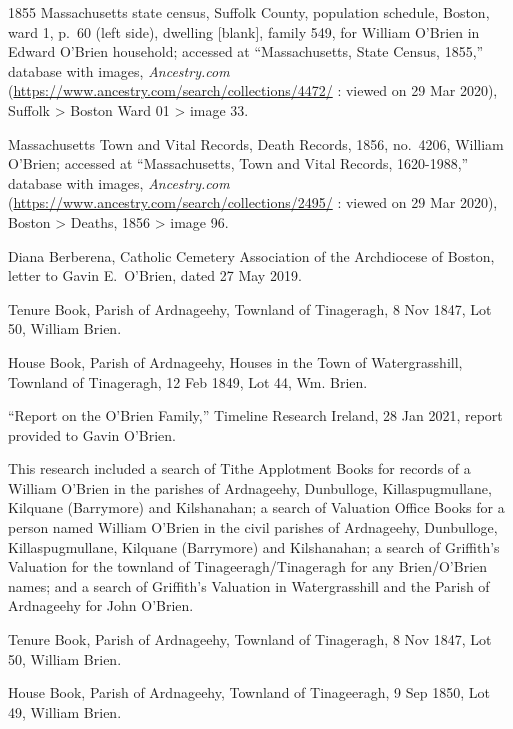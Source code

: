 \begin{thebibliography}{999}


1855 Massachusetts state census, Suffolk County, population schedule, Boston, ward 1, p.\ 60 (left side), dwelling [blank], family 549, for William O'Brien in Edward O'Brien household; accessed at ``Massachusetts, State Census, 1855,'' database with images, \textit{Ancestry.com} (\url{https://www.ancestry.com/search/collections/4472/} : viewed on 29 Mar 2020), Suffolk > Boston Ward 01 > image 33.

Massachusetts Town and Vital Records, Death Records, 1856, no.\ 4206, William O'Brien; accessed at ``Massachusetts, Town and Vital Records, 1620-1988,'' database with images, \textit{Ancestry.com} (\url{https://www.ancestry.com/search/collections/2495/} : viewed on 29 Mar 2020), Boston > Deaths, 1856 > image 96.

Diana Berberena, Catholic Cemetery Association of the Archdiocese of Boston, letter to Gavin E.\ O'Brien, dated 27 May 2019.

Tenure Book, Parish of Ardnageehy, Townland of Tinageragh, 8 Nov 1847, Lot 50, William Brien.

House Book, Parish of Ardnageehy, Houses in the Town of Watergrasshill, Townland of Tinageragh, 12 Feb 1849, Lot 44, Wm. Brien.

``Report on the O'Brien Family,'' Timeline Research Ireland, 28 Jan 2021, report provided to Gavin O'Brien.

This research included a search of Tithe Applotment Books for records of a William O'Brien in the parishes of Ardnageehy, Dunbulloge, Killaspugmullane, Kilquane (Barrymore) and Kilshanahan; a search of Valuation Office Books for a person named William O'Brien in the civil parishes of Ardnageehy, Dunbulloge, Killaspugmullane, Kilquane (Barrymore) and Kilshanahan; a search of Griffith's Valuation for the townland of Tinageeragh/Tinageragh for any Brien/O'Brien names; and a search of Griffith's Valuation in Watergrasshill and the Parish of Ardnageehy for John O'Brien.

Tenure Book, Parish of Ardnageehy, Townland of Tinageragh, 8 Nov 1847, Lot 50, William Brien.

House Book, Parish of Ardnageehy, Townland of Tinageeragh, 9 Sep 1850, Lot 49, William Brien.


\end{thebibliography}
